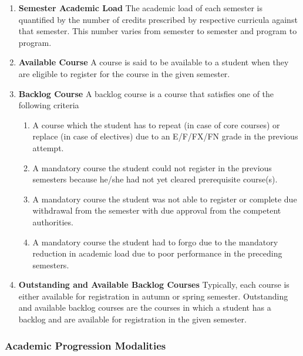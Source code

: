 \begin{enumerate}
    \item \textbf{Semester Academic Load} The academic load of each semester is quantified by the number of credits prescribed by respective curricula against that semester. This number varies from semester to semester and program to program.
    \item \textbf{Available Course} A course is said to be available to a student when they are eligible to register for the course in the given semester.
    \item \textbf{Backlog Course} A backlog course is a course that satisfies one of the following criteria
    
    \begin{enumerate}
        \item A course which the student has to repeat (in case of core courses) or replace (in case of electives) due to an E/F/FX/FN grade in the previous attempt. 
        \item A mandatory course the student could not register in the previous semesters because he/she had not yet cleared prerequisite course(s).
        \item A mandatory course the student was not able to register or complete due withdrawal from the semester with due approval from the competent authorities.
        \item A mandatory course the student had to forgo due to the mandatory reduction in academic load due to poor performance in the preceding semesters.
    \end{enumerate}
    
    \item \textbf{Outstanding and Available Backlog Courses }Typically, each course is either available for registration in autumn or spring semester. Outstanding and available backlog courses are the courses in which a student has a backlog and are available for registration in the given semester.
\end{enumerate}

\subsubsection{Academic Progression Modalities}

